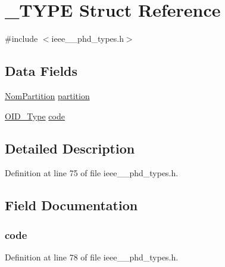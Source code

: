 \hypertarget{struct___t_y_p_e}{}\section{\+\_\+\+T\+Y\+P\+E Struct Reference}
\label{struct___t_y_p_e}


{\ttfamily \#include $<$ieee\+\_\+\_\+phd\+\_\+types.\+h$>$}

\subsection*{Data Fields}
\begin{DoxyCompactItemize}
\item 
\hyperlink{ieee__11073__phd__types_8h_a277bbb183f81bb15ffde4c8c5bd5109a}{Nom\+Partition} \hyperlink{struct___t_y_p_e_a620c25fa7766fb56ad6e76a5afb6f9d9}{partition}
\item 
\hyperlink{ieee__11073__phd__types_8h_aa4d7af235d4a95d6632aa0d64160dd62}{O\+I\+D\+\_\+\+Type} \hyperlink{struct___t_y_p_e_a1f509f9df18f2da2b63853c617b216ad}{code}
\end{DoxyCompactItemize}


\subsection{Detailed Description}


Definition at line 75 of file ieee\+\_\+\_\+phd\+\_\+types.\+h.



\subsection{Field Documentation}
\hypertarget{struct___t_y_p_e_a1f509f9df18f2da2b63853c617b216ad}{}
\subsubsection[{code}]{ code}\label{struct___t_y_p_e_a1f509f9df18f2da2b63853c617b216ad}


Definition at line 78 of file ieee\+\_\+\_\+phd\+\_\+types.\+h.

\hypertarget{struct___t_y_p_e_a620c25fa7766fb56ad6e76a5afb6f9d9}{}
